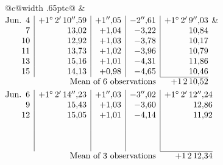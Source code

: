 \noindent\begin{tabular}{@{}c@{\hspace{.4em}\vrule width .65pt\hspace{.4em}}c@{}}
 &
 \\[.18ex]
\(\begin{array}[t]{@{}r|r|r|r|r@{}}
\text{Jun.}\enspace 4 & +1^\circ\,2'\,10''{,}59 & +1''{,}05 & -2''{,}61 & +1^\circ\,2'\,9''{,}03\\
7 & 13{,}02 & +1{,}04 & -3{,}22 & 10{,}84\\
10 & 12{,}92 & +1{,}03 & -3{,}78 & 10{,}17\\
11 & 13{,}73 & +1{,}02 & -3{,}96 & 10{,}79\\
13 & 15{,}16 & +1{,}01 & -4{,}31 & 11{,}86\\
15 & 14{,}13 & +0{,}98 & -4{,}65 & 10{,}46\\
\cline{5-5}
\multicolumn{4}{r}{\text{Mean of 6 observations}} & +1\,2\,10{,}52
\end{array}\)
&
\(\begin{array}[t]{@{}r|r|r|r|r@{}}
\text{Jun.}\enspace 6 & +1^\circ\,2'\,14''{,}23 & +1''{,}03 & -3''{,}02 & +1^\circ\,2'\,12''{,}24\\
9 & 15{,}43 & +1{,}03 & -3{,}60 & 12{,}86\\
12 & 15{,}05 & +1{,}01 & -4{,}14 & 11{,}92\\
 & & & & \\
 & & & & \\
 & & & & \\
\cline{5-5}
\multicolumn{4}{r}{\text{Mean of 3 observations}} & +1\,2\,12{,}34
\end{array}\)
\end{tabular}\par\medskip
{}
